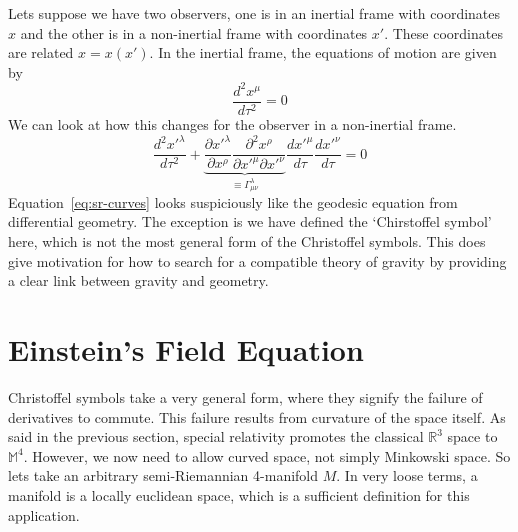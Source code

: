 Lets suppose we have two observers, one is in an inertial frame with coordinates $x$ and the other is in a non-inertial frame with coordinates $x'$. These coordinates are related $x = x(x')$. In the inertial frame, the equations of motion are given by 
\begin{equation}
    \frac{d^2x^\mu}{d\tau^2} = 0
\end{equation} 
We can look at how this changes for the observer in a non-inertial frame.
\begin{equation}\label{eq:sr-curves}
    \frac{d^2x'^\lambda}{d\tau^2}+\underbrace{\frac{\partial x'^\lambda}{\partial x^\rho}\frac{\partial^2 x^\rho}{\partial x'^\mu \partial x'^\nu}}_{\equiv \Gamma_{\mu\nu}^\lambda} \frac{d x'^\mu}{d \tau} \frac{d x'^\nu}{d \tau} = 0
\end{equation}
Equation~\ref{eq:sr-curves} looks suspiciously like the geodesic equation from differential geometry. The exception is we have defined the `Chirstoffel symbol' here, which is not the most general form of the Christoffel symbols. This does give motivation for how to search for a compatible theory of gravity by providing a clear link between gravity and geometry. 
\section{Einstein's Field Equation}
Christoffel symbols take a very general form, where they signify the failure of derivatives to commute. This failure results from curvature of the space itself. As said in the previous section, special relativity promotes the classical $\mathbb{R}^3$ space to $\mathbb{M}^4$. However, we now need to allow curved space, not simply Minkowski space. So lets take an arbitrary semi-Riemannian 4-manifold $M$. In very loose terms, a manifold is a locally euclidean space, which is a sufficient definition for this application.

